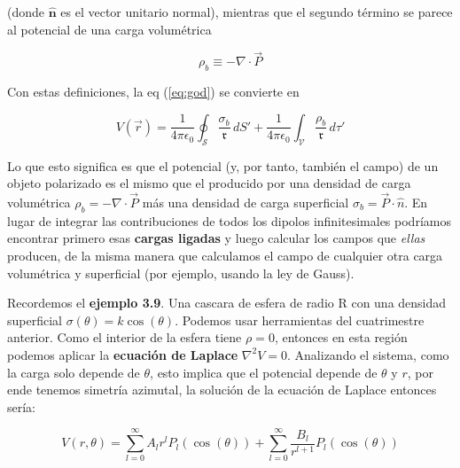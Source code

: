 \documentclass[12pt,a4paper]{report}
\newcommand{\esp}{\vspace{0.5cm}}
\begin{document}
	\esp
	
	\noindent (donde $\mathbf{\hat{n}}$ es el vector unitario normal), mientras que el segundo término se parece al potencial de una carga volumétrica
	
	\esp
	
	\begin{equation}
		\rho_b \equiv -\nabla \cdot \vec{P}
	\end{equation}
	
	\esp
	
	\noindent Con estas definiciones, la eq (\ref{eq:god}) se convierte en
	
	\begin{equation}
		V(\vec{r}) = \frac{1}{4\pi\epsilon_0} \oint_{\mathcal{S}} \frac{\sigma_b}{\mathfrak{r}} \, dS' + \frac{1}{4\pi\epsilon_0} \int_{\mathcal{V}} \frac{\rho_b}{\mathfrak{r}} \, d\tau'
		\label{eq:guay}
	\end{equation}
	
	\esp
	
	\noindent Lo que esto significa es que el potencial (y, por tanto, también el campo) de un objeto polarizado es el mismo que el producido por una densidad de carga volumétrica $\rho_b = -\nabla \cdot \vec{P}$ más una densidad de carga superficial $\sigma_b = \vec{P} \cdot \hat{n}$. En lugar de integrar las contribuciones de todos los dipolos infinitesimales podríamos encontrar primero esas \textbf{cargas ligadas} y luego calcular los campos que \textit{ellas} producen, de la misma manera que calculamos el campo de cualquier otra carga volumétrica y superficial (por ejemplo, usando la ley de Gauss).

	\esp
	
	Recordemos el \textbf{ejemplo 3.9}. Una cascara de esfera de radio R con una densidad superficial $\sigma(\theta)=k\cos(\theta)$. Podemos usar herramientas del cuatrimestre anterior. Como el interior de la esfera tiene $\rho = 0$, entonces en esta región podemos aplicar la \textbf{ecuación de Laplace} $\nabla^2V=0$. Analizando el sistema, como la carga solo depende de $\theta$, esto implica que el potencial depende de $\theta$ y $r$, por ende tenemos simetría azimutal, la solución de la ecuación de Laplace entonces sería:
	
	\begin{equation}
		V(r, \theta) = \sum_{l=0}^\infty A_l r^l P_l(\cos(\theta)) + \sum_{l=0}^\infty \frac{B_l}{r^{l+1}} P_l(\cos(\theta))
	\end{equation}
	
	\esp
	
\end{document}
